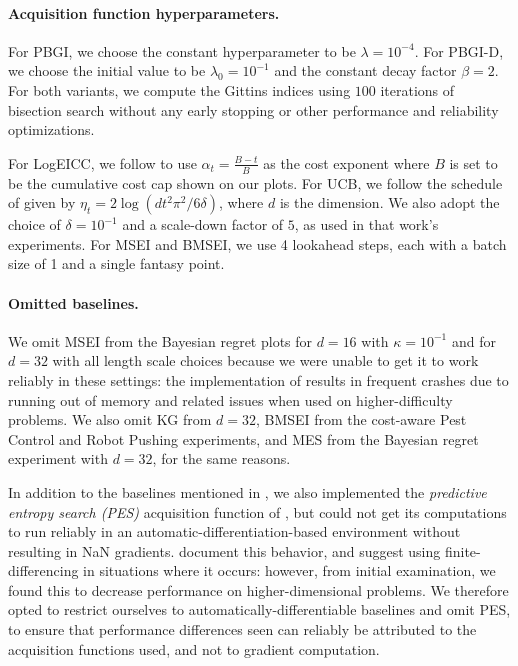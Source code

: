 \documentclass{article}
\begin{document}
\paragraph*{Acquisition function hyperparameters.}
For PBGI, we choose the constant hyperparameter to be $\lambda = 10^{-4}$. For PBGI-D, we choose the initial value to be $\lambda_0=10^{-1}$ and the constant decay factor $\beta=2$. 
For both variants, we compute the Gittins indices using $100$ iterations of bisection search without any early stopping or other performance and reliability optimizations.

For LogEICC, we follow \textcite{lee2020cost} to use $\alpha_t=\frac{B-t}{B}$ as the cost exponent where $B$ is set to be the cumulative cost cap shown on our plots.
For UCB, we follow the schedule of \textcite{srinivas2009gaussian} given by $\eta_t=2\log(d t^2\pi^2/6\delta)$, where $d$ is the dimension. 
We also adopt the choice of $\delta=10^{-1}$ and a scale-down factor of $5$, as used in that work's experiments. 
For MSEI and BMSEI, we use 4 lookahead steps, each with a batch size of 1 and a single fantasy point.

\paragraph*{Omitted baselines.}

We omit MSEI from the Bayesian regret plots for $d=16$ with $\kappa = 10^{-1}$ and for $d=32$ with all length scale choices because we were unable to get it to work reliably in these settings: the implementation of \textcite{jiang2020efficient} results in frequent crashes due to running out of memory and related issues when used on higher-difficulty problems.
We also omit KG from $d=32$, BMSEI from the cost-aware Pest Control and Robot Pushing experiments, and MES from the Bayesian regret experiment with $d=32$, for the same reasons.

In addition to the baselines mentioned in , we also implemented the \emph{predictive entropy search (PES)} acquisition function of \textcite{hernandez2014predictive}, but could not get its computations to run reliably in an automatic-differentiation-based environment without resulting in NaN gradients.
\textcite{hernandez2014predictive} document this behavior, and suggest using finite-differencing in situations where it occurs: however, from initial examination, we found this to decrease performance on higher-dimensional problems.
We therefore opted to restrict ourselves to automatically-differentiable baselines and omit PES, to ensure that performance differences seen can reliably be attributed to the acquisition functions used, and not to gradient computation.
\end{document}
